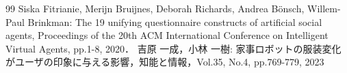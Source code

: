 \documentclass[a4paper,10pt,twocolumn]{myjarticle2}
\begin{document}
\begin{thebibliography}{99}
Siska Fitrianie, Merĳn Bruĳnes, Deborah Richards, Andrea B\"{o}nsch, Willem-Paul Brinkman: The 19 unifying questionnaire constructs of artificial social agents, Proceedings of the 20th ACM International Conference on Intelligent Virtual Agents, pp.1-8, 2020．
吉原 一成，小林 一樹: 家事ロボットの服装変化がユーザの印象に与える影響，知能と情報，Vol.35, No.4, pp.769-779, 2023
\end{thebibliography}
\vspace{-1mm}\par\noindent
\end{document}
